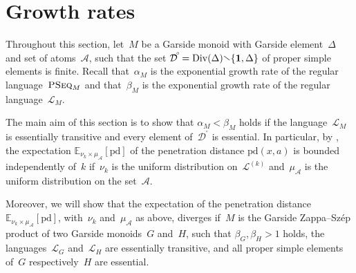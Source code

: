 \documentclass[a4paper,final]{article}
\theoremstyle{plain}
\theoremstyle{remark}
\theoremstyle{definition}
\begin{document}
\section{Growth rates}\label{S:GrowthRates}

Throughout this section, let~$M$ be a Garside monoid with Garside element~$\Delta$ and set of atoms~${\mathcal{A}}$, such that the set ${{\mathcal{D}}^{\!{}^{\circ}\!}}=\operatorname{Div}(\Delta){\mathbin{\raisebox{0.25ex}{$\smallsetminus$}}}\{{\mathbf{1}},\Delta\}$ of proper simple elements is finite.
Recall that~$\alpha_M$ is the exponential growth rate of the regular language~${\textsc{PSeq}}_M$ and that~$\beta_M$ is the exponential growth rate of the regular language~${\mathcal{L}}_M$.

The main aim of this section is to show that $\alpha_M < \beta_M$ holds if the language~${\mathcal{L}}_M$ is essentially transitive and every element of~${{\mathcal{D}}^{\!{}^{\circ}\!}}$ is essential.
In particular, by \cite[Theorem~4.7]{GT13}, the expectation ${\mathbb{E}}_{\nu_k\times\mu_{\mathcal{A}}}[{\mathrm{pd}}]$ of the penetration distance ${\mathrm{pd}}(x,a)$ is bounded independently of~$k$ if~$\nu_k$ is the uniform distribution on~${\mathcal{L}}^{(k)}$ and~$\mu_{\mathcal{A}}$ is the uniform distribution on the set~${\mathcal{A}}$.

Moreover, we will show that the expectation of the penetration distance ${\mathbb{E}}_{\nu_k\times\mu_{\mathcal{A}}}[{\mathrm{pd}}]$, with~$\nu_k$ and~$\mu_{\mathcal{A}}$ as above, diverges if~$M$ is the Garside {Zappa--Sz{\'e}p}{} product of two Garside monoids~$G$ and~$H$, such that $\beta_G,\beta_H>1$ holds, the languages~${\mathcal{L}}_G$ and~${\mathcal{L}}_H$ are essentially transitive, and all proper simple elements of~$G$ respectively~$H$ are essential.
\end{document}
